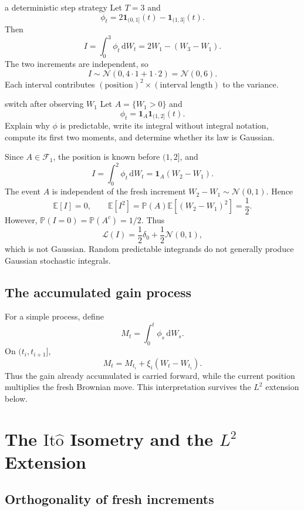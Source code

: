 \documentclass[10pt]{article}
\newcommand{\E}{\mathbb E}
\newcommand{\Pbb}{\mathbb P}
\newcommand{\1}{\mathbf 1}
\newcommand{\cF}{\mathcal F}
\newcommand{\dd}{\,\mathrm d}
\newcommand{\Ito}{\mathrm{It\hat{o}}}
\theoremstyle{definition}
\begin{document}
\begin{boardexample}{a deterministic step strategy}
Let \(T=3\) and
\[
\phi_t=2\1_{(0,1]}(t)-\1_{(1,3]}(t).
\]
Then
\[
I=\int_0^3\phi_t\dd W_t
=2W_1-(W_3-W_1).
\]
The two increments are independent, so
\[
I\sim\mathcal N(0,4\cdot1+1\cdot2)=\mathcal N(0,6).
\]
Each interval contributes
\((\text{position})^2\times(\text{interval length})\) to the variance.
\end{boardexample}

\begin{studentexercise}{switch after observing \(W_1\)}
Let \(A=\{W_1>0\}\) and
\[
\phi_t=\1_A\1_{(1,2]}(t).
\]
Explain why \(\phi\) is predictable, write its integral without integral
notation, compute its first two moments, and determine whether its law is
Gaussian.
\end{studentexercise}

\begin{shortsolution}
Since \(A\in\cF_1\), the position is known before \((1,2]\), and
\[
I=\int_0^2\phi_t\dd W_t=\1_A(W_2-W_1).
\]
The event \(A\) is independent of the fresh increment
\(W_2-W_1\sim\mathcal N(0,1)\). Hence
\[
\E[I]=0,
\qquad
\E[I^2]=\Pbb(A)\E[(W_2-W_1)^2]=\frac12.
\]
However, \(\Pbb(I=0)=\Pbb(A^c)=1/2\). Thus
\[
\mathcal L(I)=\frac12\delta_0+\frac12\mathcal N(0,1),
\]
which is not Gaussian. Random predictable integrands do not generally produce
Gaussian stochastic integrals.
\end{shortsolution}

\subsection{The accumulated gain process}

For a simple process, define
\[
M_t=\int_0^t\phi_s\dd W_s.
\]
On \((t_i,t_{i+1}]\),
\[
M_t=M_{t_i}+\xi_i(W_t-W_{t_i}).
\]
Thus the gain already accumulated is carried forward, while the current
position multiplies the fresh Brownian move. This interpretation survives the
\(L^2\) extension below.

\section{The \texorpdfstring{\(\Ito\)}{Ito} Isometry and the
\texorpdfstring{\(L^2\)}{L2} Extension}

\subsection{Orthogonality of fresh increments}
\end{document}
